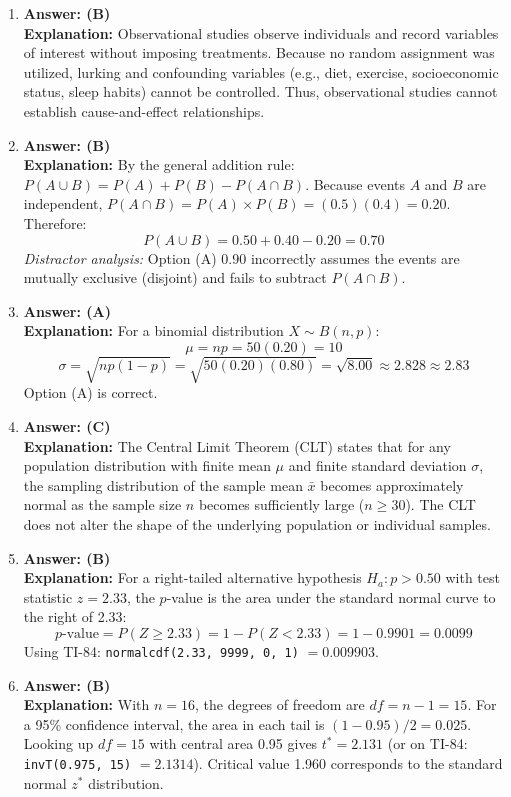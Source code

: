 \begin{enumerate}[leftmargin=1.5em]
  \item \textbf{Answer: (B)} \\
  \textbf{Explanation:} Observational studies observe individuals and record variables of interest without imposing treatments. Because no random assignment was utilized, lurking and confounding variables (e.g., diet, exercise, socioeconomic status, sleep habits) cannot be controlled. Thus, observational studies cannot establish cause-and-effect relationships.

  \item \textbf{Answer: (B)} \\
  \textbf{Explanation:} By the general addition rule: $P(A \cup B) = P(A) + P(B) - P(A \cap B)$. Because events $A$ and $B$ are independent, $P(A \cap B) = P(A) \times P(B) = (0.5)(0.4) = 0.20$.
  Therefore:
  \[ P(A \cup B) = 0.50 + 0.40 - 0.20 = 0.70 \]
  \textit{Distractor analysis:} Option (A) 0.90 incorrectly assumes the events are mutually exclusive (disjoint) and fails to subtract $P(A \cap B)$.

  \item \textbf{Answer: (A)} \\
  \textbf{Explanation:} For a binomial distribution $X \sim B(n, p)$:
  \[ \mu = np = 50(0.20) = 10 \]
  \[ \sigma = \sqrt{np(1-p)} = \sqrt{50(0.20)(0.80)} = \sqrt{8.00} \approx 2.828 \approx 2.83 \]
  Option (A) is correct.

  \item \textbf{Answer: (C)} \\
  \textbf{Explanation:} The Central Limit Theorem (CLT) states that for any population distribution with finite mean $\mu$ and finite standard deviation $\sigma$, the sampling distribution of the sample mean $\bar{x}$ becomes approximately normal as the sample size $n$ becomes sufficiently large ($n \ge 30$). The CLT does not alter the shape of the underlying population or individual samples.

  \item \textbf{Answer: (B)} \\
  \textbf{Explanation:} For a right-tailed alternative hypothesis $H_a: p > 0.50$ with test statistic $z = 2.33$, the $p$-value is the area under the standard normal curve to the right of 2.33:
  \[ p\text{-value} = P(Z \ge 2.33) = 1 - P(Z < 2.33) = 1 - 0.9901 = 0.0099 \]
  Using TI-84: \texttt{normalcdf(2.33, 9999, 0, 1)} $= 0.009903$.

  \item \textbf{Answer: (B)} \\
  \textbf{Explanation:} With $n = 16$, the degrees of freedom are $df = n - 1 = 15$. For a 95\% confidence interval, the area in each tail is $(1 - 0.95)/2 = 0.025$. Looking up $df = 15$ with central area 0.95 gives $t^* = 2.131$ (or on TI-84: \texttt{invT(0.975, 15)} $= 2.1314$). Critical value 1.960 corresponds to the standard normal $z^*$ distribution.


\end{enumerate}
